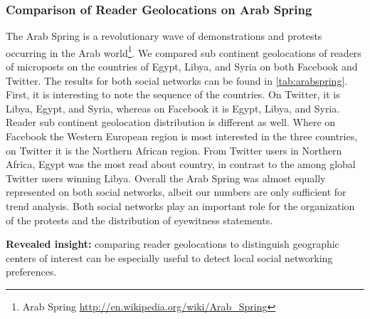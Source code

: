 \documentclass{iosart2c}
\begin{document}
\subsubsection{Comparison of Reader Geolocations on Arab Spring}
The Arab Spring is a revolutionary wave of demonstrations and protests occurring in the Arab world\footnote{Arab Spring \url{http://en.wikipedia.org/wiki/Arab\_Spring}}.
We compared sub continent geolocations of readers of microposts on the countries of Egypt, Libya, and Syria on both Facebook and Twitter.
The results for both social networks can be found in \autoref{tab:arabspring}.
First, it is interesting to note the sequence of the countries.
On Twitter, it is Libya, Egypt, and Syria, whereas on Facebook it is Egypt, Libya, and Syria. 
Reader sub continent geolocation distribution is different as well.
Where on Facebook the Western European region is most interested in the three countries, on Twitter it is the Northern African region.
From Twitter users in Northern Africa, Egypt was the most read about country, in contrast to the among global Twitter users winning Libya.
Overall the Arab Spring was almost equally represented on both social networks, albeit our numbers are only sufficient for trend analysis.
Both social networks play an important role for the organization of the protests and the distribution of eyewitness statements.

\textbf{Revealed insight:}
comparing reader geolocations to distinguish geographic centers of interest can be especially useful to detect local social networking preferences.

\begin{table}
  \centering
  \qquad
    \caption{Sub continent geolocations of reader interest of some of the Arab Spring key countries (May~1 -- November~12).}
  \label{tab:arabspring}
\end{table}
\end{document}
